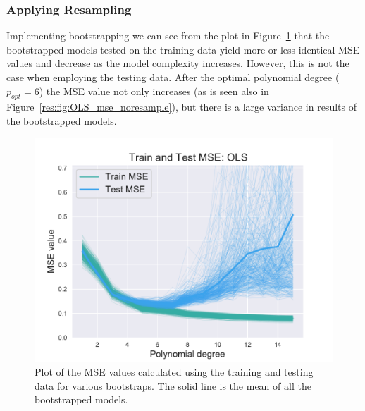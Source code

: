 \documentclass[twocolumn,english,notitlepage]{article}
\begin{document}
        \subsubsection{Applying Resampling}
            Implementing bootstrapping we can see from the plot in Figure~\ref{res:fig:bs_train_test_ols} that the bootstrapped models tested on the training data yield more or less identical MSE values and decrease as the model complexity increases. However, this is not the case when employing the testing data. After the optimal polynomial degree ($ p_{opt} = 6$) the MSE value not only increases (as is seen also in Figure~\ref{res:fig:OLS_mse_noresample}), but there is a large variance in results of the bootstrapped models.  
            \begin{figure}[ht]
                \centering
                \includegraphics[width=.9\linewidth]{BS_train_test_mse_OLS.pdf}
                \caption{Plot of the MSE values calculated using the training and testing data for various bootstraps. The solid line is the mean of all the bootstrapped models.}
                \label{res:fig:bs_train_test_ols}
            \end{figure}
  
\end{document}
